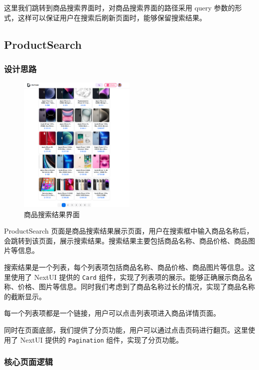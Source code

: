 这里我们跳转到商品搜索界面时，对商品搜索界面的路径采用 query 参数的形式，这样可以保证用户在搜索后刷新页面时，能够保留搜索结果。

\subsection{ProductSearch}

\subsubsection{设计思路}

\begin{figure}[H]
\centering
\includegraphics[width=0.5\textwidth]{assets/report/search_result.png}
\caption{商品搜索结果界面}
\end{figure}

ProductSearch 页面是商品搜索结果展示页面，用户在搜索框中输入商品名称后，会跳转到该页面，展示搜索结果。搜索结果主要包括商品名称、商品价格、商品图片等信息。

搜索结果是一个列表，每个列表项包括商品名称、商品价格、商品图片等信息。这里使用了 NextUI 提供的 \texttt{Card} 组件，实现了列表项的展示。能够正确展示商品名称、价格、图片等信息。同时我们考虑到了商品名称过长的情况，实现了商品名称的截断显示。

每一个列表项都是一个链接，用户可以点击列表项进入商品详情页面。

同时在页面底部，我们提供了分页功能，用户可以通过点击页码进行翻页。这里使用了 NextUI 提供的 \texttt{Pagination} 组件，实现了分页功能。

\subsubsection{核心页面逻辑}

